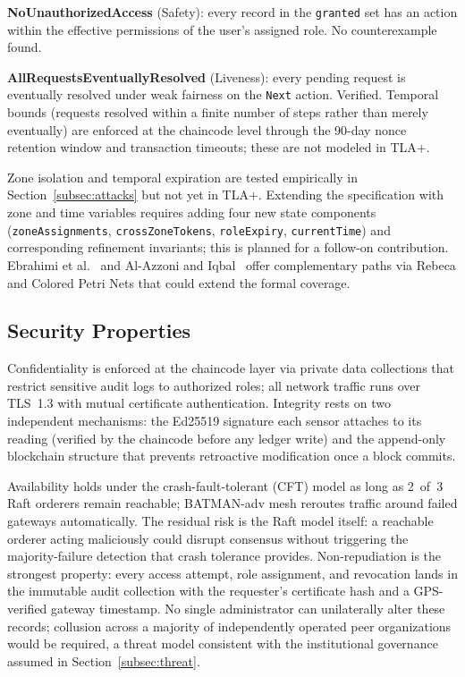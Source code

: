 \documentclass[a4paper,fleqn]{cas-dc}
\begin{document}
\textbf{NoUnauthorizedAccess} (Safety): every record in the
\texttt{granted} set has an action within the effective permissions of
the user's assigned role. No counterexample found.

\textbf{AllRequestsEventuallyResolved} (Liveness): every pending
request is eventually resolved under weak fairness on the \texttt{Next}
action. Verified. Temporal bounds (requests resolved within a finite
number of steps rather than merely eventually) are enforced at the
chaincode level through the 90-day nonce retention window and
transaction timeouts; these are not modeled in TLA+.

Zone isolation and temporal expiration are tested empirically in
Section~\ref{subsec:attacks} but not yet in TLA+. Extending the
specification with zone and time variables requires adding four new
state components (\texttt{zoneAssignments}, \texttt{crossZoneTokens},
\texttt{roleExpiry}, \texttt{currentTime}) and corresponding
refinement invariants; this is planned for a follow-on
contribution. Ebrahimi et al.~\cite{ebrahimi2023rebeca} and Al-Azzoni
and Iqbal~\cite{alazzoni2024cpn} offer complementary paths via Rebeca
and Colored Petri Nets that could extend the formal coverage.

\subsection{Security Properties}
\label{subsec:secprops}

Confidentiality is enforced at the chaincode layer via private data
collections that restrict sensitive audit logs to authorized roles;
all network traffic runs over TLS~1.3 with mutual certificate
authentication. Integrity rests on two independent mechanisms: the
Ed25519 signature each sensor attaches to its reading (verified by the
chaincode before any ledger write) and the append-only blockchain
structure that prevents retroactive modification once a block commits.

Availability holds under the crash-fault-tolerant (CFT) model as long
as 2~of~3 Raft
orderers remain reachable; BATMAN-adv mesh reroutes traffic around
failed gateways automatically. The residual risk is the Raft model
itself: a reachable orderer acting maliciously could disrupt consensus
without triggering the majority-failure detection that crash tolerance
provides. Non-repudiation is the strongest property: every access
attempt, role assignment, and revocation lands in the immutable audit
collection with the requester's certificate hash and a GPS-verified
gateway timestamp. No single administrator can unilaterally alter these
records; collusion across a majority of independently operated peer
organizations would be required, a threat model consistent with the
institutional governance assumed in Section~\ref{subsec:threat}.
\end{document}
